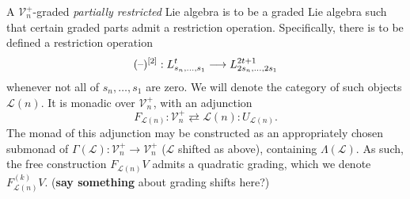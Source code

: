 \documentclass[11pt]{amsart}
\theoremstyle{plain}
\theoremstyle{definition}
\DeclareMathOperator{\im}{im}
\newcommand{\DASH}{\textup{--}}
\renewcommand{\to}{\longrightarrow}
\newcommand{\scrL}{\mathscr{L}}
\newcommand{\calL}{\mathcal{L}}
\newcommand{\calV}{\mathcal{V}}
\theoremstyle{plain}
\newcommand{\LieOperad}{{\scrL}}
\newcommand{\restn}[1]{#1^{[2]}}
\newcommand{\vect}[2]{\calV^{#1}_{#2}}
\begin{document}
\begin{Lie algebras in characteristic 2 and their homotopy operations}
A $\vect{+}{n}$-graded \emph{partially restricted} Lie algebra is to be a graded Lie algebra such that certain graded parts admit a restriction operation. Specifically, there is to be defined a restriction operation
\[\restn{(\DASH)}:L^t_{s_n,\ldots,s_1}\to L^{2t+1}_{2s_n,\ldots,2s_1}\]
whenever not all of $s_n,\ldots,s_{1}$ are zero. We will denote the category of such objects $\calL(n)$. It is monadic over $\vect{+}{n}$, with an adjunction
\[F_{\calL(n)}:\vect{+}{n}\rightleftarrows \calL(n):U_{\calL(n)}.\]
The monad of this adjunction may be constructed as an appropriately chosen submonad of $\Gamma(\LieOperad):\vect{+}{n}\to \vect{+}{n}$ ($\LieOperad$ shifted as above), containing $\Lambda(\LieOperad)$. As such, the free construction $F_{\calL(n)}V$ admits a quadratic grading, which we denote $F_{\calL(n)}^{(k)}V$.  (\textbf{say something} about grading shifts here?)


\end{Lie algebras in characteristic 2 and their homotopy operations}
\end{document}
